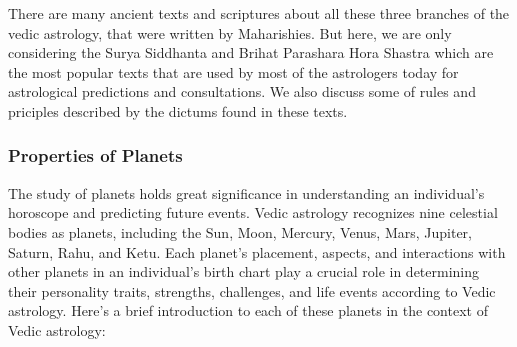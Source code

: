 There are many ancient texts and scriptures about all these three branches of the vedic astrology, that were written by Maharishies. But here, we are only considering the Surya Siddhanta\cite{SuryaSiddhanta, wiki:ss} and Brihat Parashara Hora Shastra\cite{BrihatParasharHoraShastraVol1, BrihatParasharHoraShastraVol2, wiki:bphs} which are the most popular texts that are used by most of the astrologers today for astrological predictions and consultations. We also discuss some of rules and priciples described by the dictums found in these texts.

\subsubsection{Properties of Planets}
The study of planets holds great significance in understanding an individual's horoscope and predicting future events. Vedic astrology recognizes nine celestial bodies as planets, including the Sun, Moon, Mercury, Venus, Mars, Jupiter, Saturn, Rahu, and Ketu. Each planet's placement, aspects, and interactions with other planets in an individual's birth chart play a crucial role in determining their personality traits, strengths, challenges, and life events according to Vedic astrology. Here's a brief introduction to each of these planets in the context of Vedic astrology:

